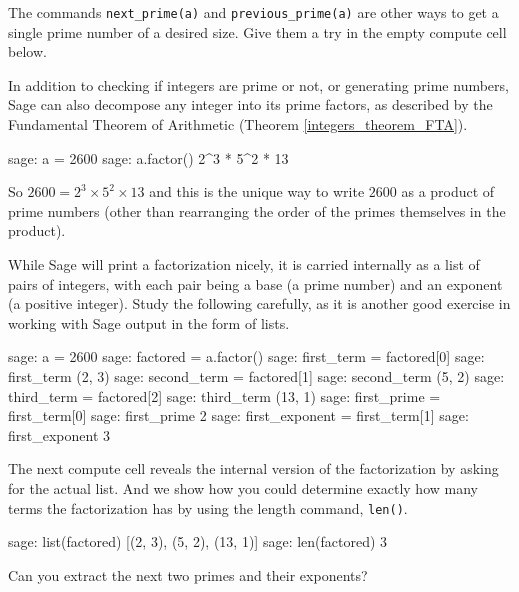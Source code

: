 %
The commands \verb?next_prime(a)? and \verb?previous_prime(a)? are other ways to get a single prime number of a desired size.  Give them a try in the empty compute cell below.
%
\begin{sageverbatim}

\end{sageverbatim}
%
In addition to checking if integers are prime or not, or generating prime numbers, Sage can also decompose any integer into its prime factors, as described by the Fundamental Theorem of Arithmetic (Theorem \ref{integers_theorem_FTA}).
%
\begin{sageexample}
sage: a = 2600
sage: a.factor()
2^3 * 5^2 * 13
\end{sageexample}
%
So $2600 = 2^3\times 5^2\times 13$ and this is the unique way to write $2600$ as a product of prime numbers (other than rearranging the order of the primes themselves in the product).\par
%
While Sage will print a factorization nicely, it is carried internally as a list of pairs of integers, with each pair being a base (a prime number) and an exponent (a positive integer).  Study the following carefully, as it is another good exercise in working with Sage output in the form of lists.
%
\begin{sageexample}
sage: a = 2600
sage: factored = a.factor()
sage: first_term = factored[0]
sage: first_term
(2, 3)
sage: second_term = factored[1]
sage: second_term
(5, 2)
sage: third_term = factored[2]
sage: third_term
(13, 1)
sage: first_prime = first_term[0]
sage: first_prime
2
sage: first_exponent = first_term[1]
sage: first_exponent
3
\end{sageexample}
%
The next compute cell reveals the internal version of the factorization by asking for the actual list.  And we show how you could determine exactly how many terms the factorization has by using the length command, \verb?len()?.
%
\begin{sageexample}
sage: list(factored)
[(2, 3), (5, 2), (13, 1)]
sage: len(factored)
3
\end{sageexample}
%
Can you extract the next two primes and their exponents?
%
\begin{sageverbatim}
\end{sageverbatim}
%











